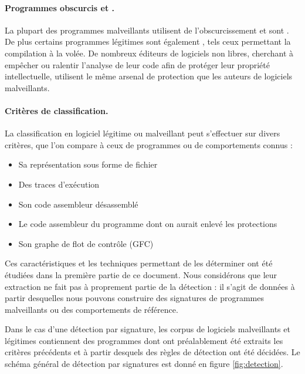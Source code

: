 \paragraph{Programmes obscurcis et \sms.}
La plupart des programmes malveillants utilisent de l'obscurcissement et sont \sms.
De plus certains programmes légitimes sont également \sms, tels ceux permettant la compilation à la volée.
De nombreux éditeurs de logiciels non libres, cherchant à empêcher ou ralentir l'analyse de leur code afin de protéger leur propriété intellectuelle, utilisent le même arsenal de protection que les auteurs de logiciels malveillants.

\paragraph{Critères de classification.}
La classification en logiciel légitime ou malveillant peut s'effectuer sur divers critères, que l'on compare à ceux de programmes ou de comportements connus :
\begin{itemize}
 \item Sa représentation sous forme de fichier
 \item Des traces d'exécution
 \item Son code assembleur désassemblé
 \item Le code assembleur du programme dont on aurait enlevé les protections
 \item Son graphe de flot de contrôle (GFC)
\end{itemize}

Ces caractéristiques et les techniques permettant de les déterminer ont été étudiées dans la première partie de ce document.
Nous considérons que leur extraction ne fait pas à proprement partie de la détection : il s'agit de données à partir desquelles nous pouvons construire des signatures de programmes malveillants ou des comportements de référence.

Dans le cas d'une détection par signature, les corpus de logiciels malveillants et légitimes contiennent des programmes dont ont préalablement été extraits les critères précédents et à partir desquels des règles de détection ont été décidées.
Le schéma général de détection par signatures est donné en figure \ref{fig:detection}.

